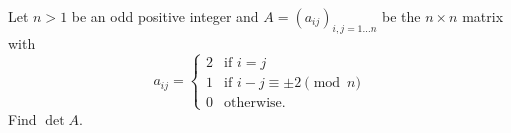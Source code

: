 \documentclass{article}
\begin{document}
\setlength{\parindent}{0pt}
Let $n>1$ be an odd positive integer and $A=(a_{ij})_{i,j=1\dots n}$ be the $n\times n$ matrix with$$a_{ij}=\begin{cases}
2&\text{if }i=j\\
1&\text{if }i-j\equiv\pm2\pmod n\\
0&\text{otherwise.}
\end{cases}$$Find $\det A$.
\end{document}
